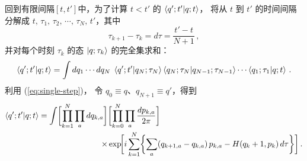 回到有限间隔$[t,t']$中，为了计算 $t<t'$ 的 $\braket{q';t'|q;t}$，
将从 $t$ 到 $t'$ 的时间间隔分解成
$t,\,\tau_1,\,\tau_2,\,\cdots,\,\tau_N,\,t'$，其中
\begin{equation}\label{eq:dt}
  \tau_{k+1}-\tau_k = d\tau = \frac{t'-t}{N+1}\,,
\end{equation}
并对每个时刻 $\tau_k$ 的态 $\ket{q;\tau_k}$
的完全集求和：
\begin{equation}\label{eq:slicing}
  \braket{q';t'|q;t}
  =\int dq_1\cdots dq_N\;
    \braket{q';t'|q_N;\tau_N}
    \braket{q_N;\tau_N|q_{N-1};\tau_{N-1}}
    \cdots
    \braket{q_1;\tau_1|q;t}\,.
\end{equation}
利用 (\ref{eq:single-step})，
令 $q_0\equiv q$、$q_{N+1}\equiv q'$，得到
\begin{equation}\label{eq:PI-discrete}
  \begin{aligned}
      \braket{q';t'|q;t}
  =\int\biggl[\prod_{k=1}^{N}\prod_a dq_{k,a}\biggr]
    &\biggl[\prod_{k=0}^{N}\prod_a
      \frac{dp_{k,a}}{2\pi}\biggr]\\\times
  &\exp\!\biggl[
    i\sum_{k=1}^{N}\biggl\{
      \sum_a(q_{k+1,a}-q_{k,a})\,p_{k,a}
      -H(q_k+1,p_{k})\,d\tau
    \biggr\}
  \biggr]\,.
  \end{aligned}
\end{equation}

